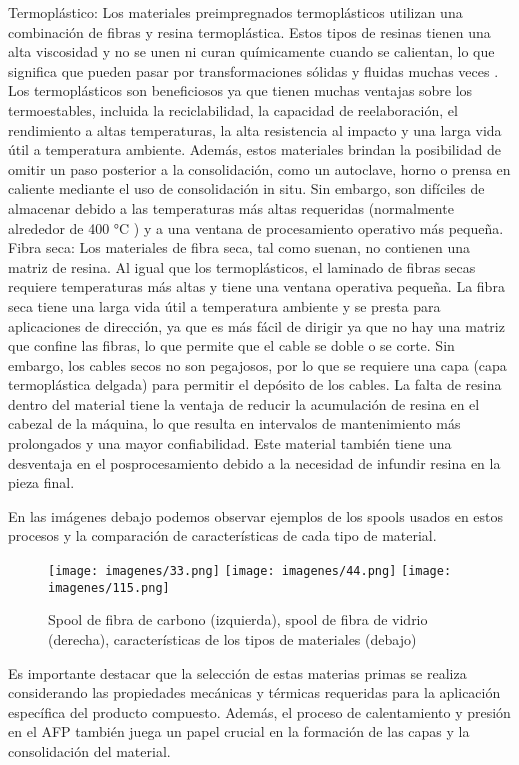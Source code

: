 Termoplástico:
Los materiales preimpregnados termoplásticos utilizan una combinación de fibras y resina termoplástica. Estos tipos de resinas tienen una alta viscosidad y no se unen ni curan químicamente cuando se calientan, lo que significa que pueden pasar por transformaciones sólidas y fluidas muchas veces . Los termoplásticos son beneficiosos ya que tienen muchas ventajas sobre los termoestables, incluida la reciclabilidad, la capacidad de reelaboración, el rendimiento a altas temperaturas, la alta resistencia al impacto y una larga vida útil a temperatura ambiente. Además, estos materiales brindan la posibilidad de omitir un paso posterior a la consolidación, como un autoclave, horno o prensa en caliente mediante el uso de consolidación in situ. Sin embargo, son difíciles de almacenar debido a las temperaturas más altas requeridas (normalmente alrededor de 400 °C  ) y a una ventana de procesamiento operativo más pequeña.\\

Fibra seca:
Los materiales de fibra seca, tal como suenan, no contienen una matriz de resina. Al igual que los termoplásticos, el laminado de fibras secas requiere temperaturas más altas y tiene una ventana operativa pequeña. La fibra seca tiene una larga vida útil a temperatura ambiente y se presta para aplicaciones de dirección, ya que es más fácil de dirigir ya que no hay una matriz que confine las fibras, lo que permite que el cable se doble o se corte. Sin embargo, los cables secos no son pegajosos, por lo que se requiere una capa (capa termoplástica delgada) para permitir el depósito de los cables. La falta de resina dentro del material tiene la ventaja de reducir la acumulación de resina en el cabezal de la máquina, lo que resulta en intervalos de mantenimiento más prolongados y una mayor confiabilidad. Este material también tiene una desventaja en el posprocesamiento debido a la necesidad de infundir resina en la pieza final.



En las imágenes debajo podemos observar ejemplos de los spools usados en estos procesos y la comparación de características de cada tipo de material.
\begin{figure}[H]
\begin{center}
\texttt{[image: imagenes/33.png]}
\texttt{[image: imagenes/44.png]}
\texttt{[image: imagenes/115.png]}
\caption{Spool de fibra de carbono (izquierda), spool de fibra de vidrio (derecha), características de los tipos de materiales (debajo)}
\label{afp}
\end{center}
\end{figure}
Es importante destacar que la selección de estas materias primas se realiza considerando las propiedades mecánicas y térmicas requeridas para la aplicación específica del producto compuesto. Además, el proceso de calentamiento y presión en el AFP también juega un papel crucial en la formación de las capas y la consolidación del material.

